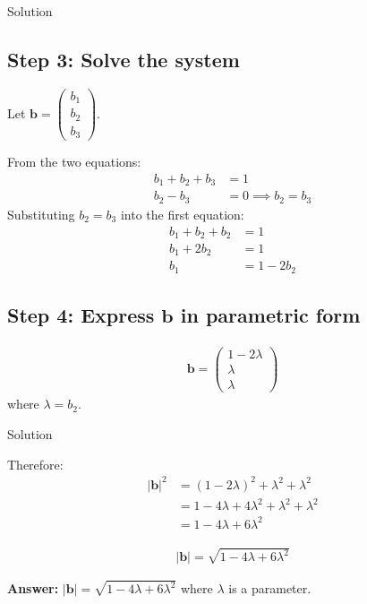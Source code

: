 \documentclass{beamer}
\newcommand{\myvec}[1]{\ensuremath{\begin{pmatrix}#1\end{pmatrix}}}
\begin{document}
\begin{frame}{Solution}
\subsection*{Step 3: Solve the system}

Let $\mathbf{b} = \myvec{b_1\\b_2\\b_3}$.

From the two equations:
\begin{align}
	b_1 + b_2 + b_3 &= 1\\
	b_2 - b_3 &= 0 \implies b_2 = b_3
\end{align}
	Substituting $b_2 = b_3$ into the first equation:
\begin{align}
	b_1 + b_2 + b_2 &= 1\\
	b_1 + 2b_2 &= 1\\
	b_1 &= 1 - 2b_2
\end{align}

\subsection*{Step 4: Express $\mathbf{b}$ in parametric form}
\begin{align}
	\mathbf{b} = \myvec{1 - 2\lambda\\\lambda\\\lambda}
\end{align}
where $\lambda = b_2$.
\end{frame}

\begin{frame}{Solution}
	
Therefore:
\begin{align}
	|\mathbf{b}|^2 &= (1 - 2\lambda)^2 + \lambda^2 + \lambda^2\\
	&= 1 - 4\lambda + 4\lambda^2 + \lambda^2 + \lambda^2\\
	&= 1 - 4\lambda + 6\lambda^2
\end{align}

\begin{align}
	|\mathbf{b}| = \sqrt{1 - 4\lambda + 6\lambda^2}
\end{align}

\textbf{Answer:} $|\mathbf{b}| = \sqrt{1 - 4\lambda + 6\lambda^2}$ where $\lambda$ is a parameter.

\end{frame}
\end{document}
